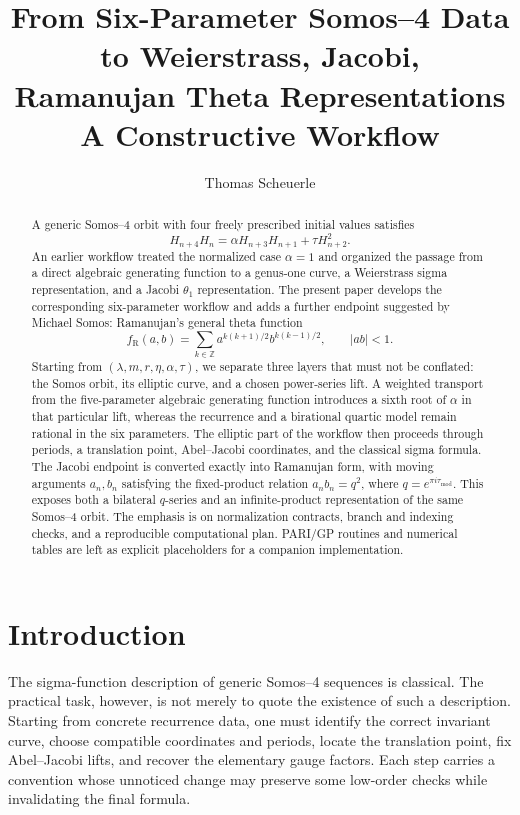\documentclass[11pt]{article}
\title{From Six-Parameter Somos--4 Data to Weierstrass, Jacobi,\\
Ramanujan Theta Representations\\[0.4em]
\large A Constructive Workflow}
\author{Thomas Scheuerle}
\date{}
\newcommand{\taupar}{\tau}
\newcommand{\taumod}{\tau_{\mathrm{mod}}}
\newcommand{\RamF}{f_{\mathrm R}}
\begin{document}
\maketitle

\begin{abstract}
A generic Somos--4 orbit with four freely prescribed initial values satisfies
\[
 H_{n+4}H_n=\alpha H_{n+3}H_{n+1}+\taupar H_{n+2}^2.
\]
An earlier workflow treated the normalized case $\alpha=1$ and organized the
passage from a direct algebraic generating function to a genus-one curve, a
Weierstrass sigma representation, and a Jacobi $\theta_1$ representation.
The present paper develops the corresponding six-parameter workflow and adds
a further endpoint suggested by Michael Somos: Ramanujan's general theta
function
\[
 \RamF(a,b)=\sum_{k\in\mathbb Z}
 a^{k(k+1)/2}b^{k(k-1)/2},\qquad |ab|<1.
\]
Starting from $(\lambda,m,r,\eta,\alpha,\taupar)$, we separate three layers that
must not be conflated: the Somos orbit, its elliptic curve, and a chosen
power-series lift.  A weighted transport from the five-parameter algebraic
generating function introduces a sixth root of $\alpha$ in that particular
lift, whereas the recurrence and a birational quartic model remain rational in
the six parameters.  The elliptic part of the workflow then proceeds through
periods, a translation point, Abel--Jacobi coordinates, and the classical
sigma formula.  The Jacobi endpoint is converted exactly into Ramanujan form,
with moving arguments $a_n,b_n$ satisfying the fixed-product relation
$a_nb_n=q^2$, where $q=e^{\pi i\taumod}$.  This exposes both a bilateral
$q$-series and an infinite-product representation of the same Somos--4 orbit.
The emphasis is on normalization contracts, branch and indexing checks, and a
reproducible computational plan.  PARI/GP routines and numerical tables are
left as explicit placeholders for a companion implementation.
\end{abstract}

\section{Introduction}
The sigma-function description of generic Somos--4 sequences is classical.
The practical task, however, is not merely to quote the existence of such a
description.  Starting from concrete recurrence data, one must identify the
correct invariant curve, choose compatible coordinates and periods, locate the
translation point, fix Abel--Jacobi lifts, and recover the elementary gauge
factors.  Each step carries a convention whose unnoticed change may preserve
some low-order checks while invalidating the final formula.
\end{document}
